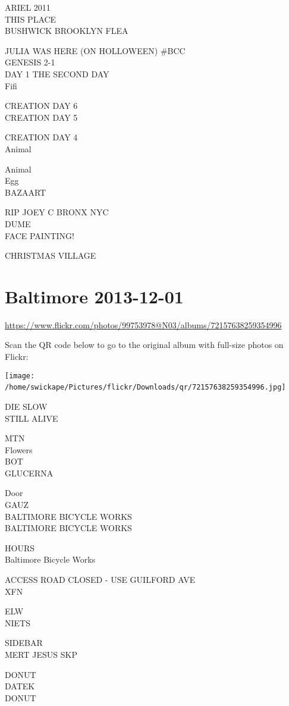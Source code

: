 \documentclass[10pt,letterpaper]{article}
\begin{document}
ARIEL 2011\\
THIS PLACE\\
BUSHWICK BROOKLYN FLEA

JULIA WAS HERE (ON HOLLOWEEN) \#BCC\\
GENESIS 2{-}1\\
DAY 1 THE SECOND DAY\\
Fifi

CREATION DAY 6\\
CREATION DAY 5

CREATION DAY 4\\
Animal

Animal\\
Egg\\
BAZAART

RIP JOEY C BRONX NYC\\
DUME\\
FACE PAINTING!

CHRISTMAS VILLAGE
\

\section*{Baltimore 2013-12-01}

\url{https://www.flickr.com/photos/99753978@N03/albums/72157638259354996}

Scan the QR code below to go to the original album with full-size photos on Flickr:

\texttt{[image: /home/swickape/Pictures/flickr/Downloads/qr/72157638259354996.jpg]}
\

DIE SLOW\\
STILL ALIVE

MTN\\
Flowers\\
BOT\\
GLUCERNA

Door\\
GAUZ\\
BALTIMORE BICYCLE WORKS\\
BALTIMORE BICYCLE WORKS

HOURS\\
Baltimore Bicycle Works

ACCESS ROAD CLOSED {-} USE GUILFORD AVE\\
XFN

ELW\\
NIETS

SIDEBAR\\
MERT JESUS SKP

DONUT\\
DATEK\\
DONUT
\end{document}
